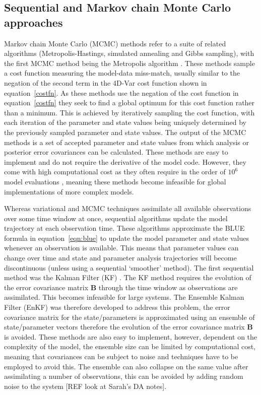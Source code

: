 \documentclass[12pt]{article}
\begin{document}
\subsection{Sequential and Markov chain Monte Carlo approaches}

Markov chain Monte Carlo (MCMC) methods refer to a suite of related algorithms (Metropolis-Hastings, simulated annealing and Gibbs sampling), with the first MCMC method being the Metropolis algorithm \citep{metropolis1953equation}. These methods sample a cost function measuring the model-data miss-match, usually similar to the negation of the second term in the 4D-Var cost function shown in equation~\eqref{costfn}. As these methods use the negation of the cost function in equation~\eqref{costfn} they seek to find a global optimum for this cost function rather than a minimum. This is achieved by iteratively sampling the cost function, with each iteration of the parameter and state values being uniquely determined by the previously sampled parameter and state values. The output of the MCMC methods is a set of accepted parameter and state values from which analysis or posterior error covariances can be calculated. These methods are easy to implement and do not require the derivative of the model code. However, they come with high computational cost as they often require in the order of \(10^{6}\) model evaluations \citep{zobitz2011primer}, meaning these methods become infeasible for global implementations of more complex models. 

Whereas variational and MCMC techniques assimilate all available observations over some time window at once, sequential algorithms update the model trajectory at each observation time. These algorithms approximate the BLUE formula in equation~\eqref{eqn:blue} to update the model parameter and state values whenever an observation is available. This means that parameter values can change over time and state and parameter analysis trajectories will become discontinuous (unless using a sequential `smoother' method). The first sequential method was the Kalman Filter (KF) \citep{kalman1960}. The KF method requires the evolution of the error covariance matrix \textbf{B} through the time window as observations are assimilated. This becomes infeasible for large systems. The Ensemble Kalman Filter (EnKF) \citep{Evensen2003} was therefore developed to address this problem, the error covariance matrix for the state/parameters is approximated using an ensemble of state/parameter vectors therefore the evolution of the error covariance matrix \textbf{B} is avoided. These methods are also easy to implement, however, dependent on the complexity of the model, the ensemble size can be limited by computational cost, meaning that covariances can be subject to noise and techniques have to be employed to avoid this. The ensemble can also collapse on the same value after assimilating a number of observations, this can be avoided by adding random noise to the system [{\color{red}REF look at Sarah's DA notes}]. 
\end{document}
